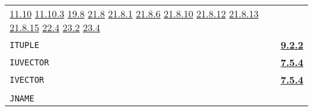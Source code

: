 \documentclass[a4paper,]{article}
\begin{document}
\begin{longtable}[]{@{}ll@{}}
\begin{minipage}[t]{0.70\columnwidth}
\href{11-input-output.md\#1110-the-net-device-the-arpa-network}{11.10} \href{11-input-output.md\#11103-nets}{11.10.3}
\href{19-compiled-programs.md\#198-rsubrs-in-files}{19.8} \href{21-interrupts.md\#218-specific-interrupts}{21.8}
\href{21-interrupts.md\#2181-char-received}{21.8.1} \href{21-interrupts.md\#2186-clock}{21.8.6}
\href{21-interrupts.md\#21810-sysdown}{21.8.10} \href{21-interrupts.md\#21812-ipc}{21.8.12}
\href{21-interrupts.md\#21813-inferior}{21.8.13} \href{21-interrupts.md\#21815-dangerous-interrupts}{21.8.15}
\href{22-storage-management.md\#224-garbage-collection-details}{22.4} \href{23-mdl-as-a-system-process.md\#232-names}{23.2}
\href{23-mdl-as-a-system-process.md\#234-inter-process-communication}{23.4}\strut
\end{minipage}\tabularnewline
\begin{minipage}[t]{0.24\columnwidth}\raggedright\strut
\texttt{ITUPLE}\strut
\end{minipage} & \begin{minipage}[t]{0.70\columnwidth}\raggedright\strut
\textbf{\href{09-functions.md\#922-tuple-the-subr-and-ituple}{9.2.2}}\strut
\end{minipage}\tabularnewline
\begin{minipage}[t]{0.24\columnwidth}\raggedright\strut
\texttt{IUVECTOR}\strut
\end{minipage} & \begin{minipage}[t]{0.70\columnwidth}\raggedright\strut
\textbf{\href{07-structured-objects.md\#754-ilist-ivector-iuvector-and-istring-1}{7.5.4}}\strut
\end{minipage}\tabularnewline
\begin{minipage}[t]{0.24\columnwidth}\raggedright\strut
\texttt{IVECTOR}\strut
\end{minipage} & \begin{minipage}[t]{0.70\columnwidth}\raggedright\strut
\textbf{\href{07-structured-objects.md\#754-ilist-ivector-iuvector-and-istring-1}{7.5.4}}\strut
\end{minipage}\tabularnewline
\begin{minipage}[t]{0.24\columnwidth}\raggedright\strut
\strut
\end{minipage} & \begin{minipage}[t]{0.70\columnwidth}\raggedright\strut
\strut
\end{minipage}\tabularnewline
\begin{minipage}[t]{0.24\columnwidth}\raggedright\strut
\texttt{JNAME}\strut
\end{minipage} & \begin{minipage}[t]{0.70\columnwidth}\raggedright\strut

\end{minipage}
\end{longtable}
\end{document}
